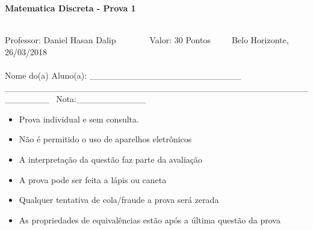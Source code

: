 \documentclass[16pt]{examdesign}
\begin{document}
\begin{examtop}
      
    \begin{multicols}{2}[]
    \begin{minipage}{2.5cm}
    \end{minipage}
      \columnbreak
      \begin{minipage}{400px}
      \begin{center}\large{\textbf{Matematica Discreta - Prova 1}}\end{center}~\\
      Professor: Daniel Hasan Dalip~~~~~~~~Valor: 30 Pontos~~~~~Belo Horizonte, 26/03/2018\\~\\
      Nome do(a) Aluno(a): \_\_\_\_\_\_\_\_\_\_\_\_\_\_\_\_\_\_\_\_\_\_\_\_	\_\_\_\_\_\_\_\_\_\_\_\_\_\_\_\_\_\_\_\_\_\_\_\_\_\_\_\_\_\_\_\_\_\_\_\_\_\_\_\_\_\_\_\_\_\_\_\_\_\_\_\_\_\_\_~
      Nota:\_\_\_\_\_\_\_\_\_\_\_\\       
      \end{minipage}



    \end{multicols}
  \hrulefill
  \begin{multicols}{2}[]
  
    \begin{itemize}
    \item Prova individual e sem consulta.\vspace{-6pt}
    \item Não é permitido o uso de aparelhos eletrônicos  \vspace{-6pt}
    \item A interpretação da questão faz parte da avaliação  \vspace{-6pt}
    \item A prova pode ser feita a lápis ou caneta  \vspace{-6pt}
    \item Qualquer tentativa de cola/fraude a prova será zerada  \vspace{-6pt}
    \item As propriedades de equivalências estão após a última questão da prova  \vspace{-6pt}
    \end{itemize}
  \end{multicols}

\def\arraystretch{1}
\end{examtop}
\end{document}
